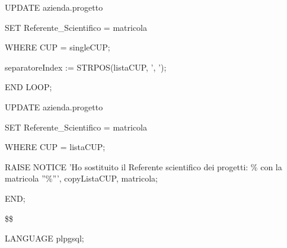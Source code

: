 \begin{flushleft}
\begin{description}
\begin{description}
\begin{description}
                            \vspace{0.5cm}

                            \item UPDATE azienda.progetto
                            \item SET Referente\_Scientifico = matricola
                            \item WHERE CUP = singleCUP;
                            
                            \vspace{0.5cm}

                            \item separatoreIndex := STRPOS(listaCUP, ', ');
                        \end{description}
                        \item END LOOP;
                        \item UPDATE azienda.progetto
                        \item SET Referente\_Scientifico = matricola
                        \item WHERE CUP = listaCUP;
                        \item RAISE NOTICE 'Ho sostituito il Referente scientifico dei progetti: \% con la matricola ''\%''', copyListaCUP, matricola;
                    \end{description}
                    \item END;
                    \item \$\$
                    \item LANGUAGE plpgsql;
                \end{description}
            \end{flushleft}
        \normalfont             

